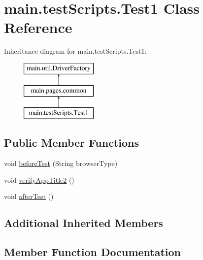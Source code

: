\hypertarget{classmain_1_1test_scripts_1_1_test1}{}\section{main.\+test\+Scripts.\+Test1 Class Reference}
\label{classmain_1_1test_scripts_1_1_test1}
Inheritance diagram for main.\+test\+Scripts.\+Test1\+:\begin{figure}[H]
\begin{center}
\leavevmode
\includegraphics[height=3.000000cm]{classmain_1_1test_scripts_1_1_test1}
\end{center}
\end{figure}
\subsection*{Public Member Functions}
\begin{DoxyCompactItemize}
\item 
void \mbox{\hyperlink{classmain_1_1test_scripts_1_1_test1_a8dc6636009624d1b3d4dbbf804642e79}{before\+Test}} (String browser\+Type)
\item 
void \mbox{\hyperlink{classmain_1_1test_scripts_1_1_test1_a2c86a510c69dfa3237bcab629cc80a73}{verify\+App\+Title2}} ()
\item 
void \mbox{\hyperlink{classmain_1_1test_scripts_1_1_test1_aa27f8330d3cfc47141559c5799ed8139}{after\+Test}} ()
\end{DoxyCompactItemize}
\subsection*{Additional Inherited Members}


\subsection{Member Function Documentation}
\mbox{\label{classmain_1_1test_scripts_1_1_test1_aa27f8330d3cfc47141559c5799ed8139}} 
